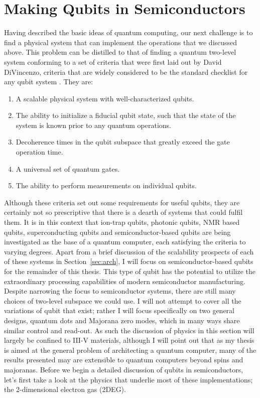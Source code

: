 \section{Making Qubits in Semiconductors}
\label{sec:qcinsm}
Having described the basic ideas of quantum computing, our next challenge is to find a physical system that
can implement the operations that we discussed above. This problem can be distilled to that
of finding a quantum two-level system conforming to a set of criteria that were first laid out by David
DiVincenzo, criteria that are widely considered to be the standard checklist for any qubit system \cite{divincenzo_crit}. They are:
\begin{enumerate}
  \item A scalable physical system with well-characterized qubits.
  \item The ability to initialize a fiducial qubit state, such that the state of the system is known prior
    to any quantum operations.
  \item Decoherence times in the qubit subspace that greatly exceed the gate operation time.
  \item A universal set of quantum gates.
  \item The ability to perform measurements on individual qubits.
\end{enumerate}
Although these criteria set out some requirements for useful qubits, they are certainly not so prescriptive
that there is a dearth of systems that could fulfil them. It is in this context that ion-trap qubits, photonic qubits,
NMR based qubits, superconducting qubits and semiconductor-based qubits are being investigated as the base of a quantum computer, each satisfying the
criteria to varying degrees. Apart from a brief discussion of the scalability prospects of each of these systems
in Section~\ref{sec:arch}, I will focus on semiconductor-based qubits for the remainder of this thesis. This type
of qubit has the potential to utilize the extraordinary processing capabilities of modern semiconductor manufacturing.
Despite narrowing the focus to semiconductor systems, there are still many
choices of two-level subspace we could use. I will not attempt to cover all the variations
of qubit that exist; rather I will focus specifically on two general designs, quantum dots and Majorana zero modes,
which in many ways share similar control and read-out. As such the discussion of physics in this section will
largely be confined to III-V materials, although I will point out that as my thesis is aimed at the general
problem of architecting a quantum computer, many of the results presented may are extensible to quantum
computers beyond spins and majoranas. Before we begin a detailed discussion of qubits in semiconductors, let's first take a look
at the physics that underlie most of these implementations; the 2-dimensional electron gas (2DEG).

